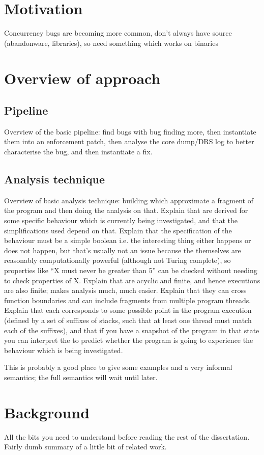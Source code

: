 \section{Motivation}
Concurrency bugs are becoming more common, don't always have source (abandonware, libraries), so need something which works on binaries

\section{Overview of approach}
\subsection{Pipeline}
Overview of the basic pipeline: find bugs with bug finding more, then instantiate them into an enforcement patch, then analyse the core dump/DRS log to better characterise the bug, and then instantiate a fix.

\subsection{Analysis technique}
Overview of basic analysis technique: building \StateMachines which approximate a fragment of the program and then doing the analysis on that.
Explain that \StateMachines are derived for some specific behaviour which is currently being investigated, and that the simplifications used depend on that.
Explain that the specification of the behaviour must be a simple boolean i.e. the interesting thing either happens or does not happen, but that's usually not an issue because the \StateMachines themselves are reasonably computationally powerful (although not Turing complete), so properties like ``X must never be greater than 5'' can be checked without needing to check properties of X.
Explain that \StateMachines are acyclic and finite, and hence executions are also finite; makes analysis much, much easier.
Explain that they can cross function boundaries and can include fragments from multiple program threads.
Explain that each \StateMachine corresponds to some possible point in the program execution (defined by a set of suffixes of stacks, such that at least one thread must match each of the suffixes), and that if you have a snapshot of the program in that state you can interpret the \StateMachine to predict whether the program is going to experience the behaviour which is being investigated.

This is probably a good place to give some examples and a very informal semantics; the full semantics will wait until later.

\section{Background}
All the bits you need to understand before reading the rest of the dissertation.
Fairly dumb summary of a little bit of related work.
